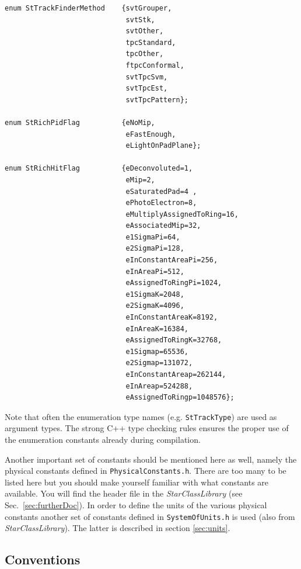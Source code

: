 \documentclass[twoside]{article}
\newcommand{\name}[1]{\textsl{#1}}%
\begin{document}
\begin{verbatim}
enum StTrackFinderMethod    {svtGrouper,
                             svtStk,
                             svtOther,
                             tpcStandard,
                             tpcOther,
                             ftpcConformal,
                             svtTpcSvm,
                             svtTpcEst,
                             svtTpcPattern};

enum StRichPidFlag          {eNoMip,
                             eFastEnough,
                             eLightOnPadPlane};

enum StRichHitFlag          {eDeconvoluted=1,
                             eMip=2,
                             eSaturatedPad=4 ,
                             ePhotoElectron=8,
                             eMultiplyAssignedToRing=16,
                             eAssociatedMip=32,
                             e1SigmaPi=64,
                             e2SigmaPi=128,
                             eInConstantAreaPi=256,
                             eInAreaPi=512,
                             eAssignedToRingPi=1024,
                             e1SigmaK=2048,
                             e2SigmaK=4096,
                             eInConstantAreaK=8192,
                             eInAreaK=16384,
                             eAssignedToRingK=32768,
                             e1Sigmap=65536,
                             e2Sigmap=131072,
                             eInConstantAreap=262144,
                             eInAreap=524288,
                             eAssignedToRingp=1048576};
\end{verbatim}

Note that often the enumeration type names (e.g. \texttt{StTrackType})
are used as argument types. The strong C++ type checking rules ensures
the proper use of the enumeration constants already during
compilation.

Another important set of constants should be mentioned here as well,
namely the physical constants defined in \texttt{PhysicalConstants.h}.
There are too many to be listed here but you should make yourself
familiar with what constants are available. You will find the header
file in the \name{StarClassLibrary} (see Sec.~\ref{sec:furtherDoc}).
 In order to define the units of the various
physical constants another set of constants defined in
\texttt{SystemOfUnits.h} is used (also from \name{StarClassLibrary}).
The latter is described in section \ref{sec:units}.

\subsection{Conventions}
\label{sec:conventions}
\end{document}
